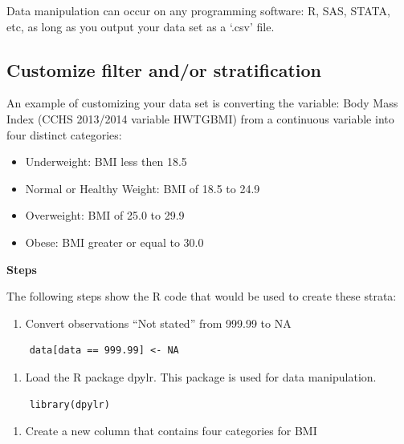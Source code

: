 \documentclass[]{book}
\providecommand{\tightlist}{%
  \setlength{\itemsep}{0pt}\setlength{\parskip}{0pt}}
\begin{document}
Data manipulation can occur on any programming software: R, SAS, STATA, etc, as long as you output your data set as a `.csv' file.

\hypertarget{customize-filter-andor-stratification}{%
\subsection{Customize filter and/or stratification}\label{customize-filter-andor-stratification}}

An example of customizing your data set is converting the variable: Body Mass Index (CCHS 2013/2014 variable HWTGBMI) from a continuous variable into four distinct categories:

\begin{itemize}
\tightlist
\item
  Underweight: BMI less then 18.5
\item
  Normal or Healthy Weight: BMI of 18.5 to 24.9
\item
  Overweight: BMI of 25.0 to 29.9
\item
  Obese: BMI greater or equal to 30.0
\end{itemize}

\textbf{Steps}

The following steps show the R code that would be used to create these strata:

\begin{enumerate}
\def\labelenumi{\arabic{enumi}.}
\tightlist
\item
  Convert observations ``Not stated'' from 999.99 to NA
\end{enumerate}

\begin{verbatim}
    data[data == 999.99] <- NA
\end{verbatim}

\begin{enumerate}
\def\labelenumi{\arabic{enumi}.}
\setcounter{enumi}{1}
\tightlist
\item
  Load the R package dpylr. This package is used for data manipulation.
\end{enumerate}

\begin{verbatim}
    library(dpylr)
\end{verbatim}

\begin{enumerate}
\def\labelenumi{\arabic{enumi}.}
\setcounter{enumi}{2}
\tightlist
\item
  Create a new column that contains four categories for BMI
\end{enumerate}
\end{document}
